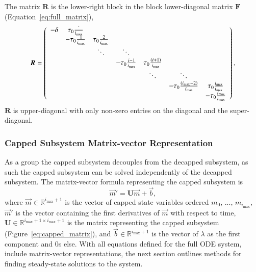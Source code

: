 \documentclass[review]{elsarticle}
\newcommand{\imax}{\ensuremath{i_{\max}}\xspace}
\let\bs\boldsymbol
\begin{document}
The matrix $\bs{R}$ is the lower-right block in the block lower-diagonal matrix $\bs{F}$ (Equation~\ref{eq:full_matrix}),
\begin{equation}
\label{eq:decapped_matrix}
\bs{R}=\left(
\begin{array}{ccccccc}
-\delta & \tau_0\frac{`}{\imax} & & & & & \\
 & -\tau_0\frac{1}{\imax} & \tau_0\frac{2}{\imax} & & & &\\
 & & \ddots & \ddots & & & \\
 & & & -\tau_0\frac{i-1}{\imax} & \tau_0\frac{(i+1)}{\imax} & & \\
 & & & & \ddots & \ddots & \\
 & & & & & -\tau_0\frac{(\imax-2)}{\imax} & \tau_0\frac{\imax}{\imax} \\
 & & & & & & -\tau_0\frac{\imax}{\imax} \\
\end{array}
\right),
\end{equation}
$\bs{R}$ is upper-diagonal with only non-zero entries on the diagonal and the super-diagonal.

\subsubsection{Capped Subsystem Matrix-vector Representation}
As a group the capped subsystem decouples from the decapped subsystem, as such the capped subsystem can be solved independently of the decapped subsystem.  
The matrix-vector formula representing the capped subsystem is \begin{equation}\label{eq:matrix_capped}\vec{m}'=\bs{U}\vec{m}+\vec{b},\end{equation} where $\vec{m}\in\mathbb{R}^{\imax+1}$ is the vector of capped state variables ordered $m_0$, ..., $m_{\imax}$, $\vec{m}'$ is the vector containing the first derivatives of $\vec{m}$ with respect to time, $\bs{U}\in\mathbb{R}^{\imax+1\times \imax+1}$ is the matrix representing the capped subsystem (Figure~\ref{eq:capped_matrix}), and $\vec{b}\in\mathbb{R}^{\imax+1}$ is the vector of $\lambda$ as the first component and 0s else.
With all equations defined for the full ODE system, include matrix-vector representations, the next section outlines methods for finding steady-state solutions to the system.




\end{document}
